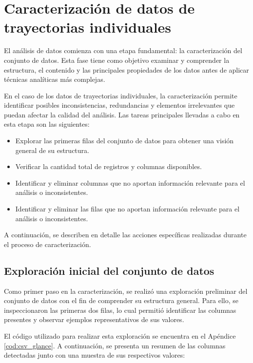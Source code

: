 \section{Caracterización de datos de trayectorias individuales}
\label{sec:caracterizacion}
El análisis de datos comienza con una etapa fundamental: la caracterización del conjunto de datos. Esta fase tiene como objetivo examinar y comprender la estructura, el contenido y las principales propiedades de los datos antes de aplicar técnicas analíticas más complejas. 

En el caso de los datos de trayectorias individuales, la caracterización permite identificar posibles inconsistencias, redundancias y elementos irrelevantes que puedan afectar la calidad del análisis. Las tareas principales llevadas a cabo en esta etapa son las siguientes:
\begin{itemize}
    \item Explorar las primeras filas del conjunto de datos para obtener una visión general de su estructura.
    \item Verificar la cantidad total de registros y columnas disponibles.
    \item Identificar y eliminar columnas que no aportan información relevante para el análisis o inconsistentes.
    \item Identificar y eliminar las filas que no aportan información relevante para el análisis o inconsistentes.
\end{itemize}
A continuación, se describen en detalle las acciones específicas realizadas durante el proceso de caracterización.


\subsection{Exploración inicial del conjunto de datos}
\label{subsec:exploracion_inicial}

Como primer paso en la caracterización, se realizó una exploración preliminar del conjunto de datos con el fin de comprender su estructura general. Para ello, se inspeccionaron las primeras dos filas, lo cual permitió identificar las columnas presentes y observar ejemplos representativos de sus valores.

El código utilizado para realizar esta exploración se encuentra en el Apéndice \ref{cod:csv_glance}. A continuación, se presenta un resumen de las columnas detectadas junto con una muestra de sus respectivos valores:

